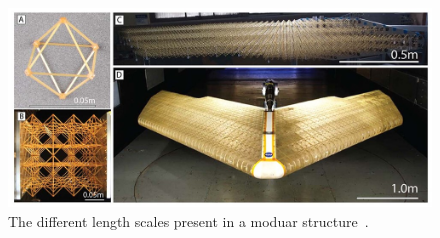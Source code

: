 \begin{figure}
    \centering
    \includegraphics[width=\linewidth]{figures/02_literature/nasa-madcat-morphing-wing-breakdown-1000-x-600(1).jpg}
    \caption{The different length scales present in a moduar structure~\cite{cramer_elastic_2019}.}
    \label{fig:02_madcat}
\end{figure}

